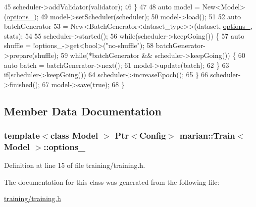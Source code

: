 \begin{DoxyCode}
45         scheduler->addValidator(validator);
46     \}
47 
48     \textcolor{keyword}{auto} model = New<Model>(\hyperlink{classmarian_1_1Train_ade849d6d35d7233dda8b58114c9c30a9}{options\_});
49     model->setScheduler(scheduler);
50     model->load();
51 
52     \textcolor{keyword}{auto} batchGenerator
53         = New<BatchGenerator<dataset\_type>>(dataset, \hyperlink{classmarian_1_1Train_ade849d6d35d7233dda8b58114c9c30a9}{options\_}, stats);
54 
55     scheduler->started();
56     \textcolor{keywordflow}{while}(scheduler->keepGoing()) \{
57       \textcolor{keyword}{auto} shuffle = !options\_->get<\textcolor{keywordtype}{bool}>(\textcolor{stringliteral}{"no-shuffle"});
58       batchGenerator->prepare(shuffle);
59       \textcolor{keywordflow}{while}(*batchGenerator && scheduler->keepGoing()) \{
60         \textcolor{keyword}{auto} batch = batchGenerator->next();
61         model->update(batch);
62       \}
63       \textcolor{keywordflow}{if}(scheduler->keepGoing())
64         scheduler->increaseEpoch();
65     \}
66     scheduler->finished();
67     model->save(\textcolor{keyword}{true});
68   \}
\end{DoxyCode}


\subsection{Member Data Documentation}
\subsubsection[{\texorpdfstring{options\+\_\+}{options_}}]{\setlength{\rightskip}{0pt plus 5cm}template$<$class Model $>$ {\bf Ptr}$<${\bf Config}$>$ {\bf marian\+::\+Train}$<$ Model $>$\+::options\+\_\+\hspace{0.3cm}{\ttfamily [private]}}\hypertarget{classmarian_1_1Train_ade849d6d35d7233dda8b58114c9c30a9}{}\label{classmarian_1_1Train_ade849d6d35d7233dda8b58114c9c30a9}


Definition at line 15 of file training/training.\+h.



The documentation for this class was generated from the following file\+:\begin{DoxyCompactItemize}
\item 
\hyperlink{training_2training_8h}{training/training.\+h}\end{DoxyCompactItemize}

